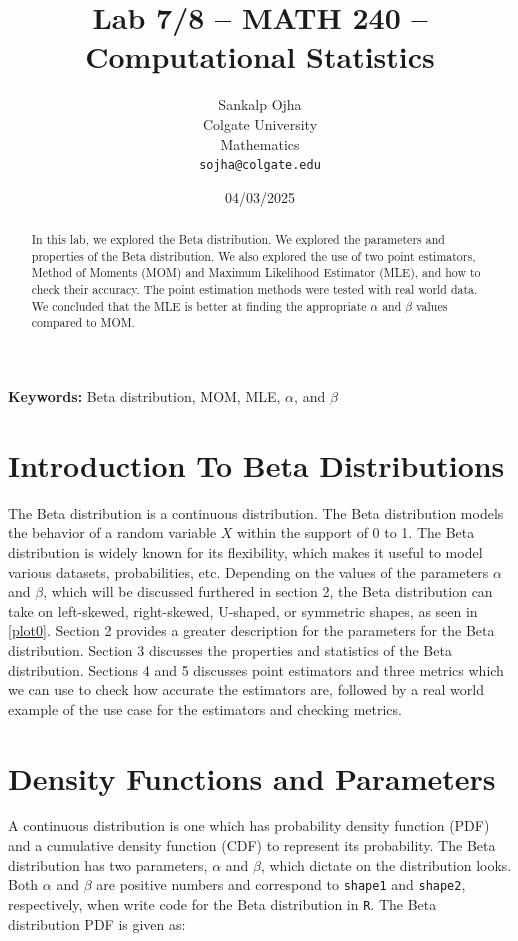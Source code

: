 \documentclass{article}\usepackage[]{graphicx}\usepackage[]{xcolor}
\begin{document}
\vspace{-1in}
\title{Lab 7/8 -- MATH 240 -- Computational Statistics}

\author{
  Sankalp Ojha \\
  Colgate University  \\
  Mathematics  \\
  {\tt sojha@colgate.edu}
}

\date{04/03/2025}

\maketitle

\begin{multicols}{2}
\begin{abstract}
In this lab, we explored the Beta distribution. We explored the parameters and properties of the Beta distribution. We also explored the use of two point estimators, Method of Moments (MOM) and Maximum Likelihood Estimator (MLE), and how to check their accuracy. The point estimation methods were tested with real world data. We concluded that the MLE is better at finding the appropriate $\alpha$ and $\beta$ values compared to MOM.
\end{abstract}

\noindent \textbf{Keywords:} Beta distribution, MOM, MLE, $\alpha$, and $\beta$

\section{Introduction To Beta Distributions}
The Beta distribution is a continuous distribution. The Beta distribution models the behavior of a random variable $X$ within the support of 0 to 1. The Beta distribution is widely known for its flexibility, which makes it useful to model various datasets, probabilities, etc. Depending on the values of the parameters $\alpha$ and $\beta$, which will be discussed furthered in section 2, the Beta distribution can take on left-skewed, right-skewed, U-shaped, or symmetric shapes, as seen in \autoref{plot0}. Section 2 provides a greater description for the parameters for the Beta distribution. Section 3 discusses the properties and statistics of the Beta distribution. Sections 4 and 5 discusses point estimators and three metrics which we can use to check how accurate the estimators are, followed by a real world example of the use case for the estimators and checking metrics.

\section{Density Functions and Parameters}
A continuous distribution is one which has probability density function (PDF) and a cumulative density function (CDF) to represent its probability. The Beta distribution has two parameters, $\alpha$ and $\beta$, which dictate on the distribution looks. Both $\alpha$ and $\beta$ are positive numbers and correspond to \texttt{shape1} and \texttt{shape2}, respectively, when write code for the Beta distribution in \texttt{R}. The Beta distribution PDF is given as:


\end{multicols}
\end{document}

